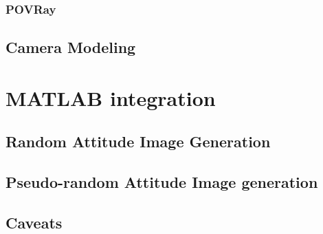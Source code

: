 \subsubsection{POVRay}

\subsection{Camera Modeling}

\section{MATLAB integration}

\subsection{Random Attitude Image Generation}

\subsection{Pseudo-random Attitude Image generation}

\subsection{Caveats}
